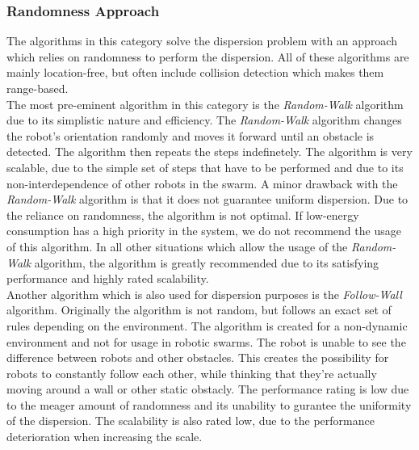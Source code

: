 \subsubsection{Randomness Approach}
The algorithms in this category solve the dispersion problem with an approach which relies on randomness to perform the dispersion.
All of these algorithms are mainly location-free, but often include collision detection which makes them range-based.\\
The most pre-eminent algorithm in this category is the \emph{Random-Walk} algorithm due to its simplistic nature and efficiency.\cite{morlok2007dispersing}
The \emph{Random-Walk} algorithm changes the robot's orientation randomly and moves it forward until an obstacle is detected. The algorithm then repeats the steps indefinetely.
The algorithm is very scalable, due to the simple set of steps that have to be performed and due to its non-interdependence of other robots in the swarm.
A minor drawback with the \emph{Random-Walk} algorithm is that it does not guarantee uniform dispersion.
Due to the reliance on randomness, the algorithm is not optimal. If low-energy consumption has a high priority in the system, we do not recommend the usage of this algorithm.
In all other situations which allow the usage of the \emph{Random-Walk} algorithm, the algorithm is greatly recommended due to its satisfying performance and highly rated scalability.\\
Another algorithm which is also used for dispersion purposes is the \emph{Follow-Wall} algorithm.\cite{morlok2007dispersing}
Originally the algorithm is not random, but follows an exact set of rules depending on the environment. 
The algorithm is created for a non-dynamic environment and not for usage in robotic swarms.
The robot is unable to see the difference between robots and other obstacles. This creates the possibility for robots to constantly follow each other, while thinking that they're actually moving around a wall or other static obstacly.
The performance rating is low due to the meager amount of randomness and its unability to gurantee the uniformity of the dispersion. The scalability is also rated low, due to the performance deterioration when increasing the scale.
